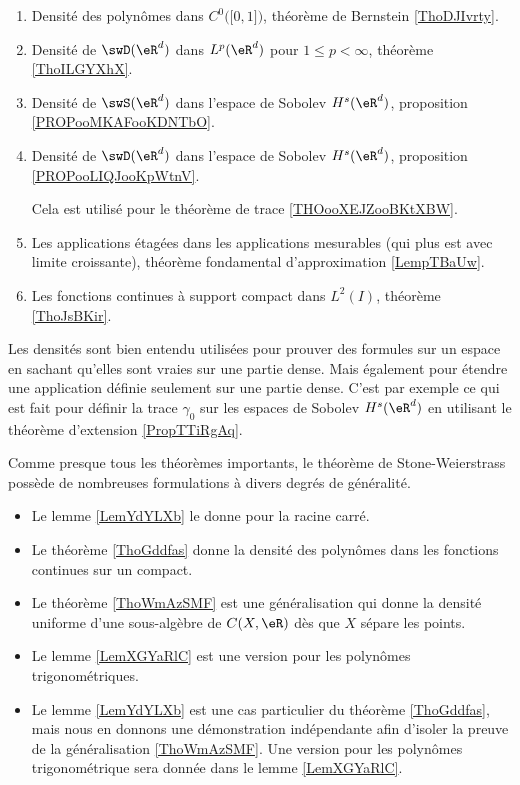 
         \label{THEooPUIIooLDPUuq}
\begin{enumerate}
    \item 
        Densité des polynômes dans \( C^0\big( \mathopen[ 0 , 1 \mathclose] \big)\), théorème de Bernstein \ref{ThoDJIvrty}.
    \item
        Densité de \( \swD(\eR^d)\) dans \( L^p(\eR^d)\) pour \( 1\leq p<\infty\), théorème \ref{ThoILGYXhX}.
    \item
        Densité de \( \swS(\eR^d)\) dans l'espace de Sobolev \( H^s(\eR^d)\), proposition \ref{PROPooMKAFooKDNTbO}. 

    \item
        Densité de \( \swD(\eR^d)\) dans l'espace de Sobolev \( H^s(\eR^d)\), proposition \ref{PROPooLIQJooKpWtnV}. 

        Cela est utilisé pour le théorème de trace \ref{THOooXEJZooBKtXBW}.
    \item
        Les applications étagées dans les applications mesurables (qui plus est avec limite croissante), théorème fondamental d'approximation \ref{LempTBaUw}.
    \item
        Les fonctions continues à support compact dans \( L^2(I)\), théorème \ref{ThoJsBKir}.
\end{enumerate}
Les densités sont bien entendu utilisées pour prouver des formules sur un espace en sachant qu'elles sont vraies sur une partie dense. Mais également pour étendre une application définie seulement sur une partie dense. C'est par exemple ce qui est fait pour définir la trace \( \gamma_0\) sur les espaces de Sobolev \( H^s(\eR^d)\) en utilisant le théorème d'extension \ref{PropTTiRgAq}.

Comme presque tous les théorèmes importants, le théorème de Stone-Weierstrass possède de nombreuses formulations à divers degrés de généralité.
\begin{itemize}
    \item Le lemme \ref{LemYdYLXb} le donne pour la racine carré.
    \item Le théorème \ref{ThoGddfas} donne la densité des polynômes dans les fonctions continues sur un compact.
    \item Le théorème \ref{ThoWmAzSMF} est une généralisation qui donne la densité uniforme d'une sous-algèbre de \( C(X,\eR)\) dès que \( X\) sépare les points.
    \item Le lemme \ref{LemXGYaRlC} est une version pour les polynômes trigonométriques.
    \item
        Le lemme \ref{LemYdYLXb} est une cas particulier du
        théorème \ref{ThoGddfas}, mais nous en donnons une démonstration indépendante afin d'isoler la preuve
de la généralisation \ref{ThoWmAzSMF}. 
Une version pour les polynômes trigonométrique sera donnée dans le lemme \ref{LemXGYaRlC}.
\end{itemize}
